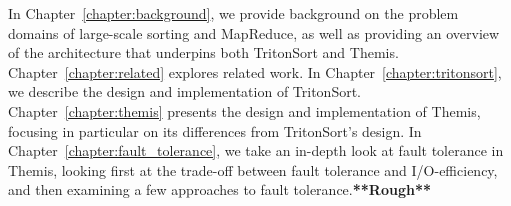 In Chapter~\ref{chapter:background}, we provide background on the problem
domains of large-scale sorting and MapReduce, as well as providing an overview
of the architecture that underpins both TritonSort and Themis.
Chapter~\ref{chapter:related} explores related work. In
Chapter~\ref{chapter:tritonsort}, we describe the design and implementation of
TritonSort. Chapter~\ref{chapter:themis} presents the design and implementation
of Themis, focusing in particular on its differences from TritonSort's
design. In Chapter~\ref{chapter:fault_tolerance}, we take an in-depth look at
fault tolerance in Themis, looking first at the trade-off between fault
tolerance and I/O-efficiency, and then examining a few approaches to fault
tolerance.\textbf{**Rough**}

